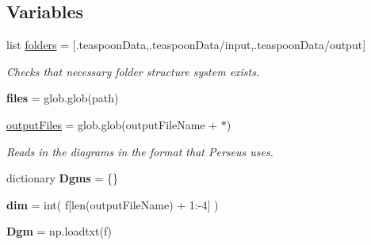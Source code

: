 \subsection*{Variables}
\begin{DoxyCompactItemize}
\item 
list \hyperlink{namespaceteaspoon_1_1_t_d_a_1_1_persistence_a5d89c08933153d3fea60fd71e9e16800}{folders} = \mbox{[}\textquotesingle{}.teaspoon\+Data\textquotesingle{},\textquotesingle{}.teaspoon\+Data/input\textquotesingle{},\textquotesingle{}.teaspoon\+Data/output\textquotesingle{}\mbox{]}
\begin{DoxyCompactList}\small\item\em Checks that necessary folder structure system exists. \end{DoxyCompactList}\item 
{\bfseries files} = glob.\+glob(path)\hypertarget{namespaceteaspoon_1_1_t_d_a_1_1_persistence_ad1e9deccaa1b4485ba18e22b81101f09}{}\label{namespaceteaspoon_1_1_t_d_a_1_1_persistence_ad1e9deccaa1b4485ba18e22b81101f09}

\item 
\hyperlink{namespaceteaspoon_1_1_t_d_a_1_1_persistence_ae41c85513e98b32d96c75124929c4d2c}{output\+Files} = glob.\+glob(output\+File\+Name + \textquotesingle{}$\ast$\textquotesingle{})
\begin{DoxyCompactList}\small\item\em Reads in the diagrams in the format that Perseus uses. \end{DoxyCompactList}\item 
dictionary {\bfseries Dgms} = \{\}\hypertarget{namespaceteaspoon_1_1_t_d_a_1_1_persistence_a23124e4420ddc7cc2be201af0d46f384}{}\label{namespaceteaspoon_1_1_t_d_a_1_1_persistence_a23124e4420ddc7cc2be201af0d46f384}

\item 
{\bfseries dim} = int( f\mbox{[}len(output\+File\+Name) + 1\+:-\/4\mbox{]} )\hypertarget{namespaceteaspoon_1_1_t_d_a_1_1_persistence_a401a006d9a9151a63298278d463f7973}{}\label{namespaceteaspoon_1_1_t_d_a_1_1_persistence_a401a006d9a9151a63298278d463f7973}

\item 
{\bfseries Dgm} = np.\+loadtxt(f)\hypertarget{namespaceteaspoon_1_1_t_d_a_1_1_persistence_ad755079d8b56f84312c5e4f23db15f19}{}\label{namespaceteaspoon_1_1_t_d_a_1_1_persistence_ad755079d8b56f84312c5e4f23db15f19}

\end{DoxyCompactItemize}


